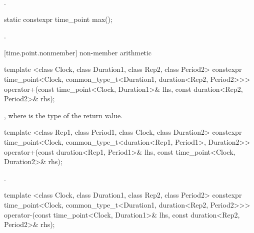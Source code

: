 \begin{itemdescr}
\pnum
\returns {}.
\end{itemdescr}

%
\begin{itemdecl}
static constexpr time_point max();
\end{itemdecl}

\begin{itemdescr}
\pnum
\returns {}.
\end{itemdescr}

[time.point.nonmember]{ non-member arithmetic}

%
%
\begin{itemdecl}
template <class Clock, class Duration1, class Rep2, class Period2>
  constexpr time_point<Clock, common_type_t<Duration1, duration<Rep2, Period2>>>
  operator+(const time_point<Clock, Duration1>& lhs, const duration<Rep2, Period2>& rhs);
\end{itemdecl}

\begin{itemdescr}
\pnum
\returns {}, where  is the type of the return value.
\end{itemdescr}

%
%
\begin{itemdecl}
template <class Rep1, class Period1, class Clock, class Duration2>
  constexpr time_point<Clock, common_type_t<duration<Rep1, Period1>, Duration2>>
  operator+(const duration<Rep1, Period1>& lhs, const time_point<Clock, Duration2>& rhs);
\end{itemdecl}

\begin{itemdescr}
\pnum
\returns {}.
\end{itemdescr}

%
%
\begin{itemdecl}
template <class Clock, class Duration1, class Rep2, class Period2>
  constexpr time_point<Clock, common_type_t<Duration1, duration<Rep2, Period2>>>
  operator-(const time_point<Clock, Duration1>& lhs, const duration<Rep2, Period2>& rhs);
\end{itemdecl}


